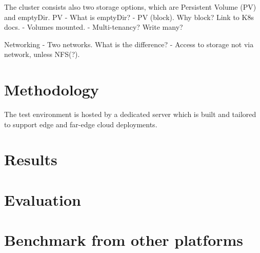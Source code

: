 The cluster consists also two storage options, which are Persistent Volume (PV) and emptyDir. PV 
    - What is emptyDir?
    - PV (block). Why block? Link to K8s docs.
    - Volumes mounted.
    - Multi-tenancy? Write many?

Networking
    - Two networks. What is the difference?
    - Access to storage not via network, unless NFS(?).






\section{Methodology}

The test environment is hosted by a dedicated server which is built and tailored to support edge and far-edge cloud deployments.


\section{Results}

\section{Evaluation}

\section{Benchmark from other platforms}